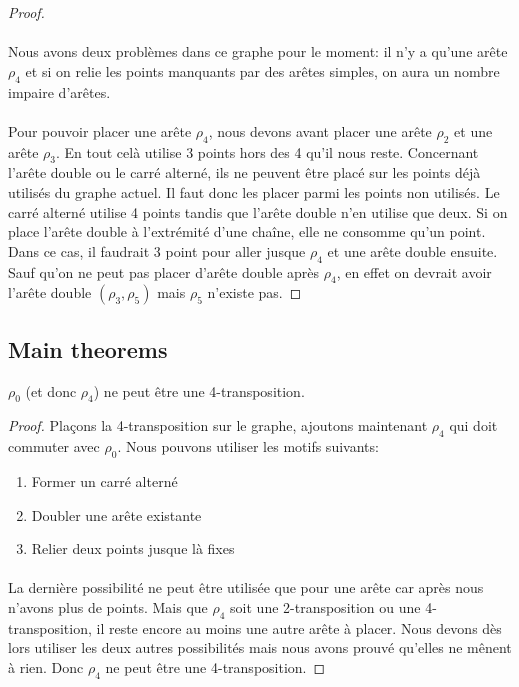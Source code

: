 \begin{proof}
  \paragraph{}
  Nous avons deux problèmes dans ce graphe pour le moment: il n'y a qu'une arête $\rho_4$ et si on relie les points manquants par des arêtes simples, on aura un nombre impaire d'arêtes.

  \paragraph{}
  Pour pouvoir placer une arête $\rho_4$, nous devons avant placer une arête $\rho_2$ et une arête $\rho_3$. En tout celà utilise 3 points hors des 4 qu'il nous reste. Concernant l'arête double ou le carré alterné, ils ne peuvent être placé sur les points déjà utilisés du graphe actuel. Il faut donc les placer parmi les points non utilisés. Le carré alterné utilise 4 points tandis que l'arête double n'en utilise que deux. Si on place l'arête double à l'extrémité d'une chaîne, elle ne consomme qu'un point. Dans ce cas, il faudrait 3 point pour aller jusque $\rho_4$ et une arête double ensuite. Sauf qu'on ne peut pas placer d'arête double après $\rho_4$, en effet on devrait avoir l'arête double $(\rho_3, \rho_5)$ mais $\rho_5$ n'existe pas.


\end{proof}

\subsection{Main theorems}

\begin{lemma}
  $\rho_0$ (et donc $\rho_4$) ne peut être une 4-transposition.
\end{lemma}

\begin{proof}
  Plaçons la 4-transposition sur le graphe, ajoutons maintenant $\rho_4$ qui doit commuter avec $\rho_0$. Nous pouvons utiliser les motifs suivants:
  \begin{enumerate}
    \item Former un carré alterné
    \item Doubler une arête existante
    \item Relier deux points jusque là fixes
  \end{enumerate}

  \paragraph{}
  La dernière possibilité ne peut être utilisée que pour une arête car après nous n'avons plus de points. Mais que $\rho_4$ soit une 2-transposition ou une 4-transposition, il reste encore au moins une autre arête à placer. Nous devons dès lors utiliser les deux autres possibilités mais nous avons prouvé qu'elles ne mênent à rien. Donc $\rho_4$ ne peut être une 4-transposition.

\end{proof}

